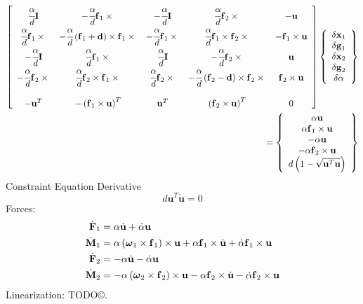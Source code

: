 \documentclass[10pt,dvips,fleqn,subeqn]{report}
\newcommand{\T}[1]{\bm{\mathbf{#1}}}
\begin{document}
\begin{align}
	\sqbr{\matr{ccccc}{
		\cfrac{\alpha}{d}\T{I} & -\cfrac{\alpha}{d}\T{f}_1\times{} &
			-\cfrac{\alpha}{d}\T{I} & \cfrac{\alpha}{d}\T{f}_2\times{} & -\T{u} \\
		\cfrac{\alpha}{d}\T{f}_1\times{} & 
			-\cfrac{\alpha}{d}\plbr{\T{f}_1 + \T{d}}\times\T{f}_1\times{} &
			-\cfrac{\alpha}{d}\T{f}_1\times{} & 
			\cfrac{\alpha}{d}\T{f}_1\times\T{f}_2\times{} & 
			-\T{f}_1\times\T{u} \\
		-\cfrac{\alpha}{d}\T{I} & \cfrac{\alpha}{d}\T{f}_1\times{} &
			\cfrac{\alpha}{d}\T{I} & -\cfrac{\alpha}{d}\T{f}_2\times{} & \T{u} \\
		-\cfrac{\alpha}{d}\T{f}_2\times{} &
			\cfrac{\alpha}{d}\T{f}_2\times\T{f}_1\times{} &
			\cfrac{\alpha}{d}\T{f}_2\times{} &
			- \cfrac{\alpha}{d}\plbr{\T{f}_2 - \T{d}}\times{\T{f}_2\times{}} &
			\T{f}_2\times\T{u} \\
		\\
		-\T{u}^T & - \plbr{\T{f}_1\times\T{u}}^T & 
			\T{u}^T & \plbr{\T{f}_2\times\T{u}}^T & 0
	}}\cubr{\cvvect{
		\delta\T{x}_1 \\
		\delta\T{g}_1 \\
		\delta\T{x}_2 \\
		\delta\T{g}_2 \\
		\delta\alpha
	}} & \nonumber \\
	\mbox{} = \cubr{\cvvect{
		\alpha \T{u} \\
		\alpha \T{f}_1\times\T{u} \\
		-\alpha \T{u} \\
		-\alpha \T{f}_2\times\T{u} \\
		d\plbr{1 - \sqrt{\T{u}^T \T{u}}}
	}} &
\end{align}
Constraint Equation Derivative
\begin{equation}
	d \T{u}^T\dot{\T{u}} = 0
\end{equation}
Forces:
\begin{subequations}
\begin{align}
	\dot{\T{F}}_1 &= \alpha \dot{\T{u}} + \dot{\alpha} \T{u} \\
	\dot{\T{M}}_1 &= \alpha \plbr{\T{\omega}_1\times\T{f}_1} \times \T{u} 
		+ \alpha \T{f}_1 \times \dot{\T{u}}
		+ \dot{\alpha} \T{f}_1 \times \T{u} \\
	\dot{\T{F}}_2 &= -\alpha \dot{\T{u}} - \dot{\alpha} \T{u} \\
	\dot{\T{M}}_2 &= -\alpha \plbr{\T{\omega}_2 \times\T{f}_2} \times \T{u}
		- \alpha \T{f}_2 \times \dot{\T{u}}
		- \dot{\alpha} \T{f}_2 \times \T{u}
\end{align}
\end{subequations}
Linearization: TODO\copyright.
\end{document}
